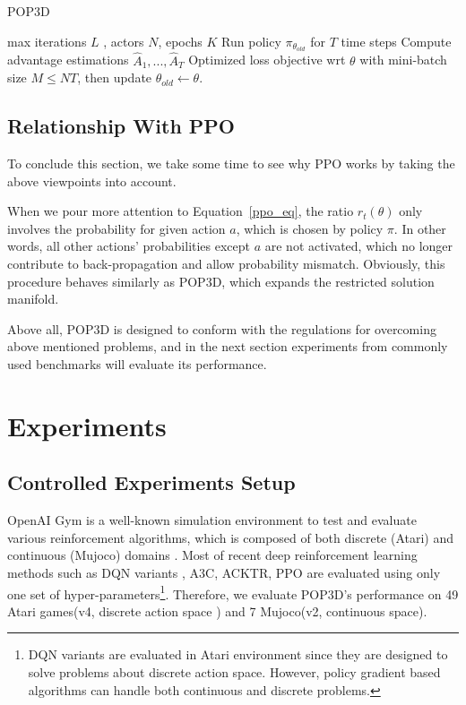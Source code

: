 \documentclass{article}
\begin{document}
\begin{algorithm}[tb]
	\caption{POP3D}
	\label{pop3d}
	\begin{algorithmic}[1]
		 max iterations $L$ , actors $N$, epochs $K$
		\STATE Run policy $\pi_{\theta_{old}}$ for $T$ time steps 
		\STATE Compute advantage estimations $\hat{A}_1,...,\hat{A}_T$
		\ENDFOR
		\STATE Optimized loss objective wrt $\theta$ with mini-batch size $M \leq NT$, then update $\theta_{old}\leftarrow\theta$.
		\ENDFOR
		\ENDFOR
	\end{algorithmic}
\end{algorithm}



\subsection{Relationship With PPO}
To conclude this section, we take some time to see why PPO works by taking the above viewpoints into account. 

When we pour more attention to  Equation~\ref{ppo_eq}, the ratio $r_t(\theta)$ only involves the probability for given action $a$, which is chosen by policy $\pi$. In other words,  all other actions' probabilities except $a$ are not activated, which no longer contribute to back-propagation and allow probability mismatch. Obviously, this procedure behaves similarly as POP3D, which expands the restricted solution manifold.

Above all, POP3D is designed to conform with the regulations for overcoming above mentioned problems, and in the next section experiments from commonly used benchmarks will evaluate its performance.

\section{Experiments}
\subsection{Controlled Experiments Setup}

OpenAI Gym is a well-known simulation environment to test and evaluate various reinforcement algorithms, which is composed of  both discrete (Atari) and continuous (Mujoco) domains \cite{brockman2016openai}. Most of recent deep reinforcement learning  methods such as DQN variants \cite{van2016deep,wang2015dueling,schaul2015prioritized,bellemare2017distributional,hessel2017rainbow}, A3C, ACKTR, PPO are evaluated using only one set of hyper-parameters\footnote{DQN variants are evaluated in Atari environment since they are designed to solve problems about discrete action space. However, policy gradient based algorithms can handle both continuous and discrete problems.}. Therefore,  we evaluate POP3D's performance on 49 Atari games(v4, discrete action space ) and 7 Mujoco(v2, continuous space).
\end{document}
